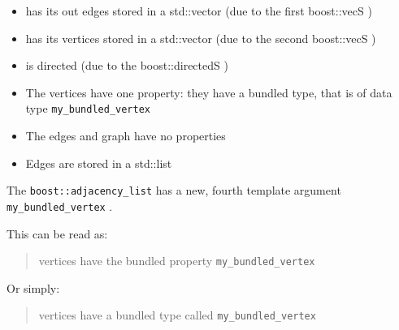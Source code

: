\begin{itemize}
  \item has its out edges stored in a std::vector 
    (due to the first boost::vecS )
  \item has its vertices stored in a std::vector 
    (due to the second boost::vecS )
  \item is directed 
    (due to the boost::directedS )
  \item The vertices have one property: 
    they have a bundled type, 
    that is of data type \verb;my_bundled_vertex;
  \item The edges and graph have no properties
  \item Edges are stored in a std::list
\end{itemize}

The \verb;boost::adjacency_list; has a new, fourth template argument 
\verb;my_bundled_vertex; .

This can be read as: 

\begin{quote}
vertices have the bundled property \verb;my_bundled_vertex;
\end{quote}

Or simply: 

\begin{quote}
vertices have a bundled type called \verb;my_bundled_vertex;
\end{quote}



